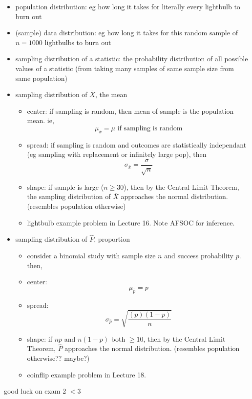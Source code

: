 \documentclass[11pt]{article}
\begin{document}
\begin{itemize}
  \item population distribution: eg how long it takes for literally every lightbulb to burn out
  \item (sample) data distribution: eg how long it takes for this random sample of  $n=1000$ lightbulbs to burn out
  \item sampling distribution of a statistic: the probability distribution of all possible values of a statistic (from taking many samples of same sample size from same population)
  \item sampling distribution of $\overline{X}$, the mean
  \begin{itemize}
    \item center: if sampling is random, then mean of sample is the population mean. ie,
    \[ \mu_{\overline{x}} = \mu \text{ if sampling is random}\]
    \item spread: if sampling is random and outcomes are statistically independant (eg sampling with replacement or infinitely large pop), then 
    \[ \sigma_{\overline{x}}=\frac{\sigma}{\sqrt{n}} \]
    \item shape: if sample is large ($n\ge 30$), then by the Central Limit Theorem, the sampling distribution of $\overline{X}$ approaches the normal distribution. (resembles population otherwise)
    \item lightbulb example problem in Lecture 16. Note AFSOC for inference.
  \end{itemize}
  \item sampling distribution of $\hat{P}$, proportion
  \begin{itemize}
    \item consider a binomial study with sample size $n$ and success probability $p$. then,
    \item center: 
    \[ \mu_{\hat{p}} = p \]
    \item spread: 
    \[ \sigma_{\hat{p}} = \sqrt{\frac{(p)(1-p)}{n}} \]
    \item shape: if $np$ and $n(1-p)$ both $\ge 10$, then by the Central Limit Theorem, $\hat{P}$ approaches the normal distribution. (resembles population otherwise?? maybe?)
    \item coinflip example problem in Lecture 18.
  \end{itemize}
\end{itemize}
good luck on exam 2 $<$3
\end{document}
